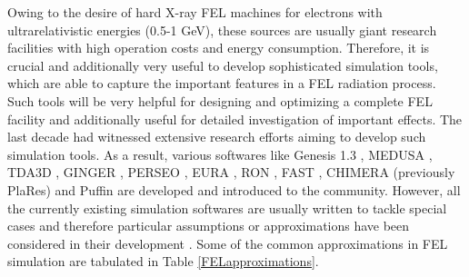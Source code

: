 Owing to the desire of hard X-ray FEL machines for electrons with ultrarelativistic energies (0.5-1 GeV), these sources are usually giant research facilities with high operation costs and energy consumption.
%
Therefore, it is crucial and additionally very useful to develop sophisticated simulation tools, which are able to capture the important features in a FEL radiation process.
%
Such tools will be very helpful for designing and optimizing a complete FEL facility and additionally useful for detailed investigation of important effects.
%
The last decade had witnessed extensive research efforts aiming to develop such simulation tools.
%
As a result, various softwares like Genesis 1.3 \cite{reiche1999genesis}, MEDUSA \cite{biedron19993d}, TDA3D \cite{tran1989tda,faatz1997tda3d}, GINGER \cite{fawley2002user}, PERSEO \cite{giannessi2006overview}, EURA \cite{bacci2008compact}, RON \cite{dejus1999integral}, FAST \cite{saldin1999fast}, CHIMERA (previously PlaRes) \cite{andriyash2015spectral} and Puffin \cite{campbell2012puffin} are developed and introduced to the community.
%
However, all the currently existing simulation softwares are usually written to tackle special cases and therefore particular assumptions or approximations have been considered in their development \cite{biedron2000multi}.
%
Some of the common approximations in FEL simulation are tabulated in Table \ref{FELapproximations}.
%
